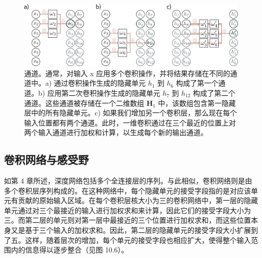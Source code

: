 \begin{figure}[ht!]
\centering
\includegraphics[width=0.7\linewidth]{png/chapter10/Conv4a.png}
\caption{通道。通常，对输入 x 应用多个卷积操作，并将结果存储在不同的通道中。a) 通过卷积操作生成的隐藏单元 \(h_1\) 到 \(h_6\) 构成了第一个通道。b) 应用第二次卷积操作生成的隐藏单元 \(h_7\) 到 \(h_{12}\) 构成了第二个通道。这些通道被存储在一个二维数组 \(\mathbf{H}_1\) 中，该数组包含第一隐藏层中的所有隐藏单元。c) 如果我们增加另一个卷积层，那么现在每个输入位置都有两个通道。此时，一维卷积通过在三个最近的位置上对两个输入通道进行加权和计算，以生成每个新的输出通道。}
\end{figure}


\subsection{卷积网络与感受野}
如第 4 章所述，深度网络包括多个全连接层的序列。与此相似，卷积网络则是由多个卷积层序列构成的。在这种网络中，每个隐藏单元的接受字段指的是对应该单元有贡献的原始输入区域。在每个卷积层核大小为三的卷积网络中，第一层的隐藏单元通过对三个最接近的输入进行加权求和来计算，因此它们的接受字段大小为三。而第二层的单元则对第一层中最接近的三个位置进行加权求和，而这些位置本身又是基于三个输入的加权求和。因此，第二层的隐藏单元的接受字段大小扩展到了五。这样，随着层次的增加，每个单元的接受字段也相应扩大，使得整个输入范围内的信息得以逐步整合（见图 10.6）。


